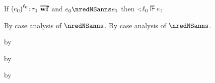 \begin{lemma}\label{H-S-label-preservation}
  If\/ $\fwellformedO{\obars{\sexpr_0}{\sowner_0}}{\stype_0}$
  and\/ $\sexpr_0 \nredNSanns \sexpr_1$
  then\/ $\snil; \sowner_0 \sWSOP \sexpr_1$
\end{lemma}{
  \newcommand{\shortpf}{By case analysis of $\nredNSanns$.}
\begin{lamportproof*}
  \shortpf
  \mainproof
  \shortpf

    \begin{pfproof}
      \qedstep
        \begin{pfproof}
          by 
        \end{pfproof}
    \end{pfproof}

    \begin{pfproof}
      \qedstep
        \begin{pfproof}
          by 
        \end{pfproof}
    \end{pfproof}

    \begin{pfproof}
      \qedstep
        \begin{pfproof}
          by 
        \end{pfproof}
    \end{pfproof}


\end{lamportproof*}}

